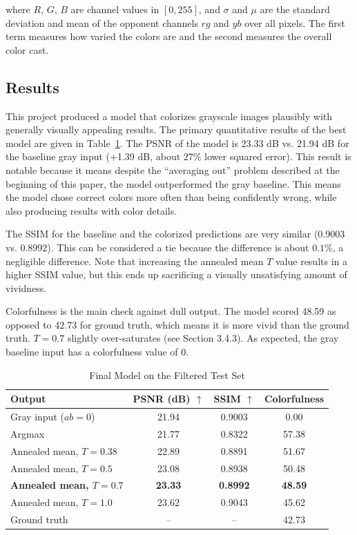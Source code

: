 \documentclass{article}
\begin{document}
where $R$, $G$, $B$ are channel values in $[0, 255]$, and $\sigma$ and $\mu$ are the standard deviation and mean of the opponent channels $rg$ and $yb$ over all pixels. The first term measures how varied the colors are and the second measures the overall color cast.

\subsection{Results}

This project produced a model that colorizes grayscale images plausibly with generally visually appealing results. The primary quantitative results of the best model are given in Table~\ref{tab:final_results}. The PSNR of the model is 23.33 dB vs. 21.94 dB for the baseline gray input (+1.39 dB, about $27\%$ lower squared error). This result is notable because it means despite the ``averaging out'' problem described at the beginning of this paper, the model outperformed the gray baseline. This means the model chose correct colors more often than being confidently wrong, while also producing results with color details.

The SSIM for the baseline and the colorized predictions are very similar (0.9003 vs. 0.8992). This can be considered a tie because the difference is about $0.1\%$, a negligible difference. Note that increasing the annealed mean $T$ value results in a higher SSIM value, but this ends up sacrificing a visually unsatisfying amount of vividness.

Colorfulness is the main check against dull output. The model scored 48.59 as opposed to 42.73 for ground truth, which means it is more vivid than the ground truth. $T = 0.7$ slightly over-saturates (see Section 3.4.3). As expected, the gray baseline input has a colorfulness value of 0.

\begin{table}[htbp]
\centering
\begin{tabular}{lccc}
\toprule
Output & PSNR (dB) $\uparrow$ & SSIM $\uparrow$ & Colorfulness \\
\midrule
Gray input ($ab = 0$) & 21.94 & 0.9003 & 0.00 \\
Argmax & 21.77 & 0.8322 & 57.38 \\
Annealed mean, $T = 0.38$ & 22.89 & 0.8891 & 51.67 \\
Annealed mean, $T = 0.5$ & 23.08 & 0.8938 & 50.48 \\
\textbf{Annealed mean, $T = 0.7$} & \textbf{23.33} & \textbf{0.8992} & \textbf{48.59} \\
Annealed mean, $T = 1.0$ & 23.62 & 0.9043 & 45.62 \\
\midrule
Ground truth & -- & -- & 42.73 \\
\bottomrule
\end{tabular}
\caption{Final Model on the Filtered Test Set}
\label{tab:final_results}
\end{table}
\end{document}
